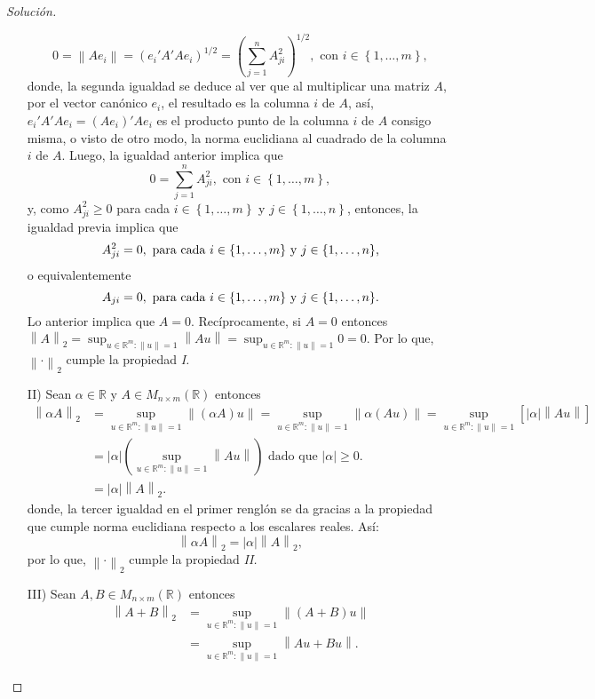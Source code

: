 \documentclass[10.5pt,notitlepage]{article}
\newenvironment{solucion}
  {\begin{proof}[Solución]}
  {\end{proof}}
\newcommand{\RR}{\mathbb{R}}
\newcommand{\abs}[1]{\left\lvert #1 \right\rvert}
\newcommand{\norm}[1]{\left\| #1 \right\|}
\newcommand{\corch}[1]{\left[ #1 \right]}
\newcommand{\kis}[1]{\left\{ #1 \right\}}
\newcommand{\pare}[1]{\left( #1 \right)}
\theoremstyle{plain}
\begin{document}
\begin{solucion}
\begin{itemize}
    \[
    0 = \norm{Ae_{i}} = \pare{e_i 'A'A e_{i}}^{1/2} = \pare{\sum_{j=1}^{n}A_{ji}^2}^{1/2}, \text{ con } i \in \kis{1, \hdots,m},
    \]
    donde, la segunda igualdad se deduce al ver que al multiplicar una matriz \(A\), por el vector canónico \(e_i\), el resultado es la columna \(i\) de \(A\), así, \(e_{i}'A'Ae_{i} = (Ae_{i})'Ae_{i}\) es el producto punto de la columna \(i\) de \(A\) consigo misma, o visto de otro modo, la norma euclidiana al cuadrado de la columna \(i\) de \(A\). Luego, la igualdad anterior implica que  
    \[
    0 = \sum_{j=1}^{n}A_{ji}^2, \text{ con } i \in \kis{1, \hdots,m},
    \]
    y, como \(A_{ji}^2 \geq 0\) para cada \( i \in \kis{1, \hdots,m}\) y \(j\in \kis{1, \hdots,n}\), entonces, la igualdad previa implica que 
    \[
    A_{ji}^2 = 0, \text{ para cada \( i \in \kis{1, \hdots,m}\) y \(j\in \kis{1, \hdots,n}\),} 
    \]
    o equivalentemente
    \[
    A_{ji} = 0, \text{ para cada \( i \in \kis{1, \hdots,m}\) y \(j\in \kis{1, \hdots,n}\).} 
    \]
    Lo anterior implica que \(A = 0\). Recíprocamente, si \(A =  0\) entonces \(\norm{A}_{2} =  \sup_{u\in \RR^{m}: \norm{u} = 1}\norm{Au} =  \sup_{u\in \RR^{m}: \norm{u} = 1}0 = 0.\) Por lo que, \(\norm{\cdot}_{2}\) cumple la propiedad \textit{I.}   
    \item[II)] Sean \(\alpha \in \RR\) y \(A \in M_{n \times m}(\RR)\) entonces 
    \begin{align*}
        \norm{\alpha A}_{2} &=  \sup_{u\in \RR^{m}: \norm{u} = 1}\norm{(\alpha A)u} =  \sup_{u\in \RR^{m}: \norm{u} = 1}\norm{\alpha (Au)}=  \sup_{u\in \RR^{m}: \norm{u} = 1}\corch{\abs{\alpha}\norm{Au}}\\ 
                            &= \abs{\alpha}\pare{\sup_{u\in \RR^{m}: \norm{u} = 1}\norm{Au}} \text{ dado que \(\abs{\alpha}\geq 0\).}\\
                            &= \abs{\alpha}\norm{A}_{2}.
    \end{align*}
    donde, la tercer igualdad en el primer renglón se da gracias a la propiedad que cumple norma euclidiana respecto a los escalares reales. Así:
    \[
     \norm{\alpha A}_{2} =\abs{\alpha}\norm{A}_{2},
    \]
    por lo que, \(\norm{\cdot}_{2}\) cumple la propiedad \textit{II.}  
    \item[III)] Sean \(A,B \in M_{n \times m}(\RR)\) entonces 
    \begin{align}\label{matenme}
        \norm{A + B}_{2} &= \sup_{u\in \RR^{m}: \norm{u} = 1}\norm{(A + B)u}\nonumber\\ 
                         &= \sup_{u\in \RR^{m}: \norm{u} = 1}\norm{Au + Bu}.

\end{align}
\end{itemize}
\end{solucion}
\end{document}

